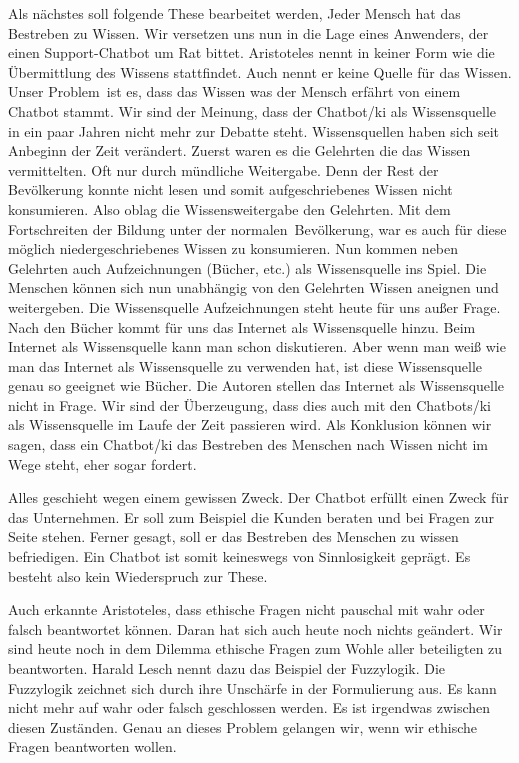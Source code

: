 Als nächstes soll folgende These bearbeitet werden, \glqq Jeder Mensch hat das Bestreben zu Wissen\grqq. Wir versetzen uns nun in die Lage eines Anwenders, der einen Support-Chatbot um Rat bittet. Aristoteles nennt in keiner Form wie die Übermittlung des Wissens stattfindet. Auch nennt er keine Quelle für das Wissen. Unser \glqq Problem\grqq\ ist es, dass das Wissen was der Mensch erfährt von einem Chatbot stammt. Wir sind der Meinung, dass der Chatbot/\ac{ki} als Wissensquelle in ein paar Jahren nicht mehr zur Debatte steht. Wissensquellen haben sich seit Anbeginn der Zeit verändert. Zuerst waren es die Gelehrten die das Wissen vermittelten. Oft nur durch mündliche Weitergabe. Denn der Rest der Bevölkerung konnte nicht lesen und somit aufgeschriebenes Wissen nicht konsumieren. Also oblag die Wissensweitergabe den Gelehrten. Mit dem Fortschreiten der Bildung unter der \glqq normalen\grqq\ Bevölkerung, war es auch für diese möglich niedergeschriebenes Wissen zu konsumieren. Nun kommen neben Gelehrten auch Aufzeichnungen (Bücher, etc.) als Wissensquelle ins Spiel. Die Menschen können sich nun unabhängig von den Gelehrten Wissen aneignen und weitergeben. Die Wissensquelle Aufzeichnungen steht heute für uns außer Frage. Nach den Bücher kommt für uns das Internet als Wissensquelle hinzu. Beim Internet als Wissensquelle kann man schon diskutieren. Aber wenn man weiß wie man das Internet als Wissensquelle zu verwenden hat, ist diese Wissensquelle genau so geeignet wie Bücher. Die Autoren stellen das Internet als Wissensquelle nicht in Frage. Wir sind der Überzeugung, dass dies auch mit den Chatbots/\ac{ki} als Wissensquelle im Laufe der Zeit passieren wird. Als Konklusion können wir sagen, dass ein Chatbot/\ac{ki} das Bestreben des Menschen nach Wissen nicht im Wege steht, eher sogar fordert.

\glqq Alles geschieht wegen einem gewissen Zweck\grqq. Der Chatbot erfüllt einen Zweck für das Unternehmen. Er soll zum Beispiel die Kunden beraten und bei Fragen zur Seite stehen. Ferner gesagt, soll er das Bestreben des Menschen zu wissen befriedigen. Ein Chatbot ist somit keineswegs von Sinnlosigkeit geprägt. Es besteht also kein Wiederspruch zur These.

Auch erkannte Aristoteles, dass ethische Fragen nicht pauschal mit wahr oder falsch beantwortet können. Daran hat sich auch heute noch nichts geändert. Wir sind heute noch in dem Dilemma ethische Fragen zum Wohle aller beteiligten zu beantworten. Harald Lesch nennt dazu das Beispiel der Fuzzylogik. Die Fuzzylogik zeichnet sich durch ihre Unschärfe in der Formulierung aus. Es kann nicht mehr auf wahr oder falsch geschlossen werden. Es ist irgendwas zwischen diesen Zuständen. Genau an dieses Problem gelangen wir, wenn wir ethische Fragen beantworten wollen.


